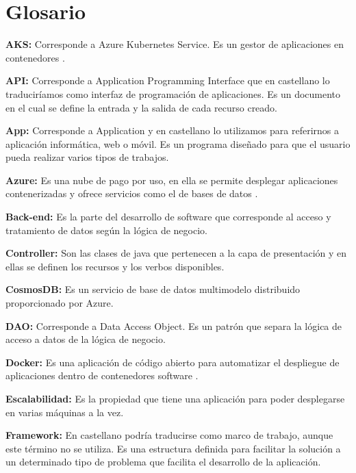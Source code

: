 \documentclass[12pt]{report} %
\begin{document}
	\newpage %
	\thispagestyle{empty}
	\mbox{}

	
\chapter*{Glosario}

\setcounter{page}{7}

\textbf{AKS:} Corresponde a Azure Kubernetes Service. Es un gestor de aplicaciones en contenedores \cite{kubernetes}.

\textbf{API:} Corresponde a Application Programming Interface que en castellano lo traduciríamos como interfaz de programación de aplicaciones. Es un documento en el cual se define la entrada y la salida de cada recurso creado.

\textbf{App:} Corresponde a Application y en castellano lo utilizamos para referirnos a aplicación informática, web o móvil. Es un programa diseñado para que el usuario pueda realizar varios tipos de trabajos.

\textbf{Azure:} Es una nube de pago por uso, en ella se permite desplegar aplicaciones contenerizadas y ofrece servicios como el de bases de datos \cite{Azure}. 

\textbf{Back-end:} Es la parte del desarrollo de software que corresponde al acceso y tratamiento de datos según la lógica de negocio.

\textbf{Controller:} Son las clases de java que pertenecen a la capa de presentación y en ellas se definen los recursos y los verbos disponibles.

\textbf{CosmosDB:} Es un servicio de base de datos multimodelo distribuido proporcionado por Azure.

\textbf{DAO:} Corresponde a Data Access Object. Es un patrón que separa la lógica de acceso a datos de la lógica de negocio.

\textbf{Docker:} Es una aplicación de código abierto para automatizar el despliegue de aplicaciones dentro de contenedores software \cite{Docker}.

\textbf{Escalabilidad:} Es la propiedad que tiene una aplicación para poder desplegarse en varias máquinas a la vez.

\textbf{Framework:} En castellano podría traducirse como marco de trabajo, aunque este término no se utiliza. Es una estructura definida para facilitar la solución a un determinado tipo de problema que facilita el desarrollo de la aplicación. 
\end{document}
